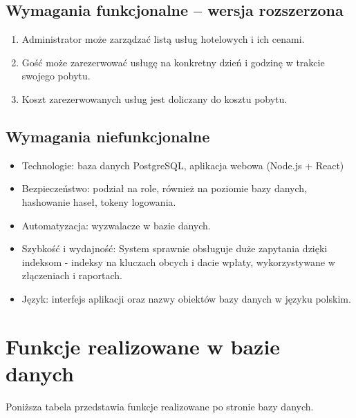 \documentclass[12pt,a4paper]{article}
\begin{document}
\subsection{Wymagania funkcjonalne -- wersja rozszerzona}
\begin{enumerate}[label=F\arabic*., ref=F\arabic*, resume=wymagania]
    \item Administrator może zarządzać listą usług hotelowych i ich cenami. \label{f:uslugi}
    \item Gość może zarezerwować usługę na konkretny dzień i godzinę w trakcie swojego pobytu. \label{f:rezerwacjauslugi}
    \item Koszt zarezerwowanych usług jest doliczany do kosztu pobytu. \label{f:kosztuslug}
\end{enumerate}

\subsection{Wymagania niefunkcjonalne}
\begin{itemize}
    \item Technologie: baza danych PostgreSQL, aplikacja webowa (Node.js + React)
    \item Bezpieczeństwo: podział na role, również na poziomie bazy danych, hashowanie haseł, tokeny logowania.
    \item Automatyzacja: wyzwalacze w bazie danych.
    \item Szybkość i wydajność: System sprawnie obsługuje duże zapytania dzięki indeksom - indeksy na kluczach obcych i dacie wpłaty, wykorzystywane w złączeniach i raportach.
    \item Język: interfejs aplikacji oraz nazwy obiektów bazy danych w języku polskim.
\end{itemize}

\section{Funkcje realizowane w bazie danych}

\noindent Poniższa tabela przedstawia funkcje realizowane po stronie bazy danych.
\end{document}
